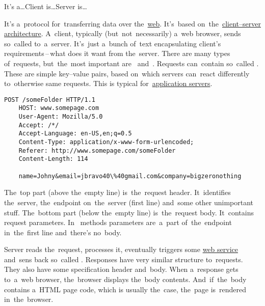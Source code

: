 \label{clientserverarchitecture}
\newline\todo It's a\dots Client is\dots Server is\dots

\label{tcpip}


\label{tcp}

\label{ip}

\label{http}
It's a~protocol for~transferring data over the~\hyperref[internetweb]{web}.
It's~based on~the~\hyperref[clientserverarchitecture]{client--server architecture}.
A~client, typically (but~not~necessarily) a~web browser, sends so~called  to~a~server.
It's~just a~bunch of~text encapsulating client's requirements\,--\,what does it want from the~server.
There are many types of~requests, but~the~most important are~ and~.
Requests can~contain so~called .
These are simple key--value pairs, based on~which servers can~react differently to~otherwise same requests.
This is typical for~\hyperref[applicationserver]{application servers}.

\begin{lstlisting}[title={Example of a~HTTP \textit{POST} request, parameters are at~the~bottom}]
    POST /someFolder HTTP/1.1
    HOST: www.somepage.com
    User-Agent: Mozilla/5.0
    Accept: /*/
    Accept-Language: en-US,en;q=0.5
    Content-Type: application/x-www-form-urlencoded;
    Referer: http://www.somepage.com/someFolder
    Content-Length: 114

    name=Johny&email=jbravo40\%40gmail.com&company=bigzeronothing
\end{lstlisting}

\noindent The~top part (above the~empty line) is~the~request header.
It~identifies the~server, the~endpoint on~the~server (first line) and~some other unimportant stuff.
The~bottom part (below the~empty line) is~the~request body.
It~contains request parameters.
In~ methods parameters are~a~part of~the~endpoint in~the~first line and~there's no~body.

Server reads the~request, processes it, eventually triggers some \hyperref[webserviceapplication]{web service} and~sens back so~called .
Responses have very similar structure to~requests.
They also have some specification header and~body.
When a~response gets to~a~web browser, the~browser displays the~body contents.
And~if~the~body contains a~HTML page code, which is usually the~case, the~page is~rendered in~the~browser.

